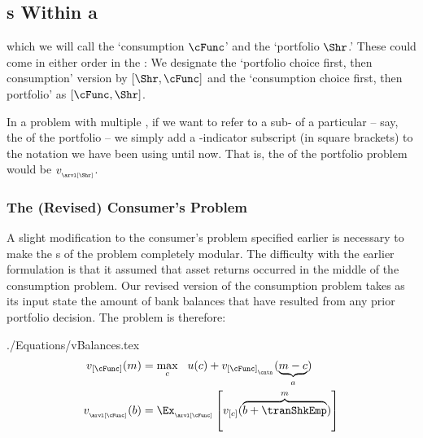 \documentclass[SolvingMicroDSOPs]{subfiles}
\begin{document}
\hypertarget{stages-within-a-period}{}
\subsection{{\Stg}s Within a {\Interval}}\label{subsec:stageswithin}

which we will call the `consumption {\stg} $\cFunc$' and the `portfolio {\stg} $\Shr$.'  These could come in either order in the {\interval}: We designate the `portfolio choice first, then consumption' version by $[\Shr,\cFunc]$ and the `consumption choice first, then portfolio' as $[\cFunc,\Shr]$.

In a problem with multiple {\stgs}, if we want to refer to a sub-{\move} of a particular {\stg} -- say, the {\Arrival} {\stg} of the portfolio {\stg} -- we simply add a {\stg}-indicator subscript (in square brackets) to the notation we have been using until now.  That is, the {\Arrival} {\stg} of the portfolio problem would be $\vFunc_{_\arvl[\Shr]}$.

\hypertarget{revised-consumers-problem}{}
\subsubsection{The (Revised) Consumer's Problem}\label{subsubsec:revised-consumers-problem}

A slight modification to the consumer's problem specified earlier is necessary to make the {\stg}s of the problem completely modular.  The difficulty with the earlier formulation is that it assumed that asset returns occurred in the middle {\move} of the consumption problem.  Our revised version of the consumption problem takes as its input state the amount of bank balances that have resulted from any prior portfolio decision.  The problem is therefore:
\begin{verbatimwrite}{./Equations/vBalances.tex}
  \begin{equation}\begin{gathered}\begin{aligned}
 \vFunc_{[\cFunc]}(\mNrm) & =  \max_{\cNrm} ~~ \uFunc(\cNrm)+  \vFunc_{[\cFunc]_{_\cntn}}(\underbrace{\mNrm-\cNrm}_{\aNrm})             
\\    \vFunc_{_\arvl[\cFunc]}(\bNrm) & = \Ex_{_\arvl[\cFunc]}\left[\vFunc_{[\cNrm]}(\overbrace{\bNrm+\tranShkEmp}^{m})\right] \label{eq:vBalances}
      \end{aligned}\end{gathered}\end{equation}
\end{verbatimwrite}
\unskip
\end{document}
